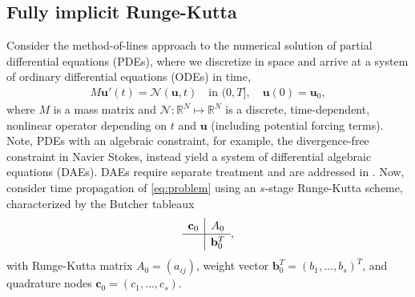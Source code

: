 \documentclass[review]{siamart}
\begin{document}
\subsection{Fully implicit Runge-Kutta}\label{sec:intro:irk}

Consider the method-of-lines approach to the numerical solution of partial differential
equations (PDEs), where we discretize in space and arrive at a system of ordinary
differential equations (ODEs) in time,
%
\begin{align}\label{eq:problem}
	M\mathbf{u}'(t) =  \mathcal{N}(\mathbf{u},t) \quad\text{in }(0,T], \quad \mathbf{u}(0) = \mathbf{u}_0,
\end{align}
%
where $M$ is a mass matrix and $\mathcal{N}:\mathbb{R}^{N}\mapsto\mathbb{R}^{N}$ is a discrete,
time-dependent, nonlinear operator depending on $t$ and $\mathbf{u}$ (including potential
forcing terms). Note, PDEs with an algebraic constraint, for example, the divergence-free
constraint in Navier Stokes, instead yield a system of differential algebraic equations
(DAEs). DAEs require separate treatment and are addressed in .
Now, consider time propagation of \eqref{eq:problem} using an $s$-stage
Runge-Kutta scheme, characterized by the Butcher tableaux
%
\begin{align*}
	\renewcommand\arraystretch{1.2}
	\begin{array}
	{c|c}
	\mathbf{c}_0 & A_0\\
	\hline
	& \mathbf{b}_0^T
	\end{array},
\end{align*}
%
with Runge-Kutta matrix $A_0 = (a_{ij})$, weight vector $\mathbf{b}_0^T = (b_1, \ldots, b_s)^T$,
and quadrature nodes $\mathbf{c}_0 = (c_1, \ldots, c_s)$.
\end{document}
